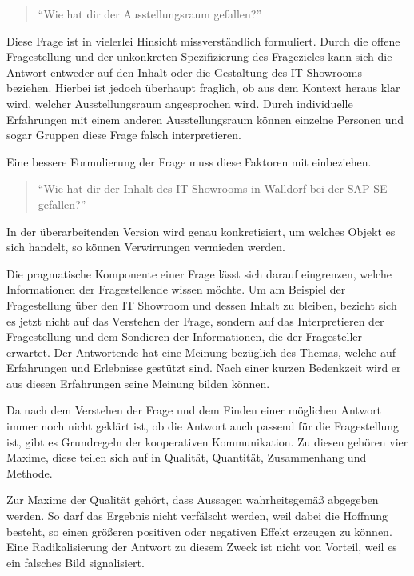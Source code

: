 \begin{quote} \enquote{Wie hat dir der Ausstellungsraum gefallen?} \end{quote}

Diese Frage ist in vielerlei Hinsicht missverständlich formuliert. 
Durch die offene Fragestellung und der unkonkreten Spezifizierung des Fragezieles kann sich die Antwort entweder auf den Inhalt oder die Gestaltung des IT Showrooms beziehen. 
Hierbei ist jedoch überhaupt fraglich, ob aus dem Kontext heraus klar wird, welcher Ausstellungsraum angesprochen wird. 
Durch individuelle Erfahrungen mit einem anderen Ausstellungsraum können einzelne Personen und sogar Gruppen diese Frage falsch interpretieren.

Eine bessere Formulierung der Frage muss diese Faktoren mit einbeziehen.
\begin{quote} \enquote{Wie hat dir der Inhalt des IT Showrooms in Walldorf bei der SAP SE gefallen?} \end{quote}

In der überarbeitenden Version wird genau konkretisiert, um welches Objekt es sich handelt, so können Verwirrungen vermieden werden.

Die pragmatische Komponente einer Frage lässt sich darauf eingrenzen, welche Informationen der Fragestellende wissen möchte. 
Um am Beispiel der Fragestellung über den IT Showroom und dessen Inhalt zu bleiben, bezieht sich es jetzt nicht auf das Verstehen der Frage, sondern auf das Interpretieren der Fragestellung und dem Sondieren der Informationen, die der Fragesteller erwartet. 
Der Antwortende hat eine Meinung bezüglich des Themas, welche auf Erfahrungen und Erlebnisse gestützt sind. 
Nach einer kurzen Bedenkzeit wird er aus diesen Erfahrungen seine Meinung bilden können.

Da nach dem Verstehen der Frage und dem Finden einer möglichen Antwort immer noch nicht geklärt ist, ob die Antwort auch passend für die Fragestellung ist, gibt es Grundregeln der kooperativen Kommunikation\autocite{Grice}. %
Zu diesen gehören vier Maxime, diese teilen sich auf in Qualität, Quantität, Zusammenhang und Methode.

Zur Maxime der Qualität gehört, dass Aussagen wahrheitsgemäß abgegeben werden. 
So darf das Ergebnis nicht verfälscht werden, weil dabei die Hoffnung besteht, so einen größeren positiven oder negativen Effekt erzeugen zu können.
Eine Radikalisierung der Antwort zu diesem Zweck ist nicht von Vorteil, weil es ein falsches Bild signalisiert.


